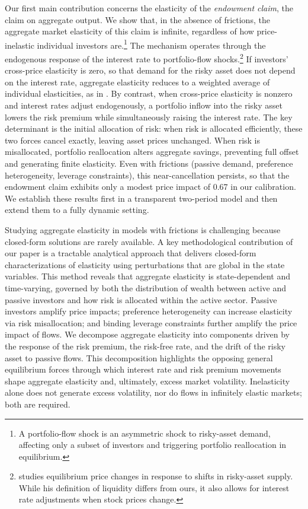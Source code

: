 \documentclass[12pt,english]{article}
\begin{document}
Our first main contribution concerns the elasticity of the \emph{endowment claim}, the claim on aggregate output. We show that, in the absence of frictions, the aggregate market elasticity of this claim is infinite, regardless of how price-inelastic individual investors are.\footnote{A portfolio-flow shock is an asymmetric shock to risky-asset demand, affecting only a subset of investors and triggering portfolio reallocation in equilibrium.} The mechanism operates through the endogenous response of the interest rate to portfolio-flow shocks.\footnote{\citet{johnson2006dynamic} studies equilibrium price changes in response to shifts in risky-asset supply. While his definition of liquidity differs from ours, it also allows for interest rate adjustments when stock prices change.} If investors' cross-price elasticity is zero, so that demand for the risky asset does not depend on the interest rate, aggregate elasticity reduces to a weighted average of individual elasticities, as in \citet{gabaix2020search}. By contrast, when cross-price elasticity is nonzero and interest rates adjust endogenously, a portfolio inflow into the risky asset lowers the risk premium while simultaneously raising the interest rate. The key determinant is the initial allocation of risk: when risk is allocated efficiently, these two forces cancel exactly, leaving asset prices unchanged. When risk is misallocated, portfolio reallocation alters aggregate savings, preventing full offset and generating finite elasticity. Even with frictions (passive demand, preference heterogeneity, leverage constraints), this near-cancellation persists, so that the endowment claim exhibits only a modest price impact of 0.67 in our calibration. We establish these results first in a transparent two-period model and then extend them to a fully dynamic setting.

Studying aggregate elasticity in models with frictions is challenging because closed-form solutions are rarely available. A key methodological contribution of our paper is a tractable analytical approach that delivers closed-form characterizations of elasticity using perturbations that are global in the state variables. This method reveals that aggregate elasticity is state-dependent and time-varying, governed by both the distribution of wealth between active and passive investors and how risk is allocated within the active sector. Passive investors amplify price impacts; preference heterogeneity can increase elasticity via risk misallocation; and binding leverage constraints further amplify the price impact of flows. We decompose aggregate elasticity into components driven by the response of the risk premium, the risk-free rate, and the drift of the risky asset to passive flows. This decomposition highlights the opposing general equilibrium forces through which interest rate and risk premium movements shape aggregate elasticity and, ultimately, excess market volatility. Inelasticity alone does not generate excess volatility, nor do flows in infinitely elastic markets; both are required.
\end{document}
